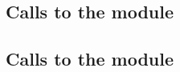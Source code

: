 \subsection{Calls to the \wcpMod{} module}     \label{system transactions: module calls: wcp calls}       
\subsection{Calls to the \eucMod{} module}     \label{system transactions: module calls: euc calls}       
